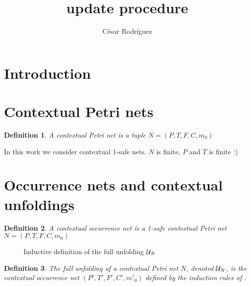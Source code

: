 \documentclass{article}
\title{\pe{} update procedure}
\author{César Rodríguez}
\newtheorem{definition}{Definition}
\begin{document}
\maketitle


\section{Introduction}
\section{Contextual Petri nets}

\begin{definition} A \emph{contextual Petri net} is a tuple $N = (P, T, F, C,
m_0)$ 
\end{definition}

In this work we consider contextual 1-safe nets.  $N$ is finite, $P$ and $T$ is
finite :)

\section{Occurrence nets and contextual unfoldings}

\begin{definition} A \emph{contextual occurrence net} is a 1-safe contextual
Petri net $N = (P, T, F, C, m_0)$ 
\end{definition}

\begin{figure}
\caption{Inductive definition of the full unfolding $\mathcal{U}_{N}$}
\label{fig:inductive.definition}
\end{figure}

\begin{definition} The \emph{full unfolding} of a contextual  Petri net $N$, denoted $\mathcal{U}_{N}$, is the contextual
occurrence net $(P', T', F', C', m'_0)$ defined by the induction rules of
. \FIXME{}
\end{definition}
\end{document}
